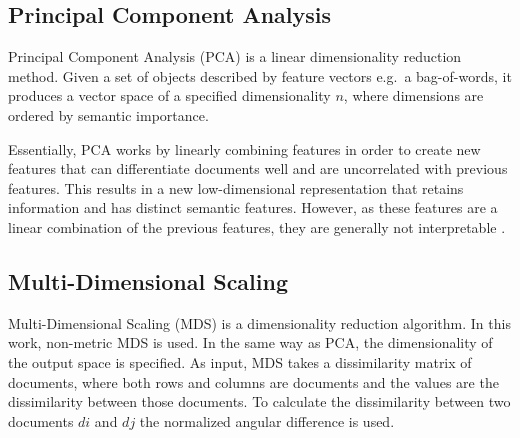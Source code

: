 \subsection{Principal Component Analysis}\label{ch2:PCA}









Principal Component Analysis (PCA) is a linear dimensionality reduction method. Given a set of objects described by feature vectors e.g.\  a bag-of-words, it produces a vector space of a specified dimensionality $n$, where dimensions are  ordered by semantic importance. 

Essentially, PCA works by linearly combining features in order to create new features that can differentiate documents well and are uncorrelated with previous features. This results in a new low-dimensional representation that retains information and has distinct semantic features. However, as these features are a linear combination of the previous features, they are generally not interpretable \cite{Gimenez}. 


\subsection{Multi-Dimensional Scaling}\label{ch2:MDS}


Multi-Dimensional Scaling  (MDS) is a dimensionality reduction algorithm. In this work, non-metric MDS is used. In the same way as PCA, the dimensionality of the output space is specified. As input, MDS takes a dissimilarity matrix of documents, where both rows and columns are documents and the values are the dissimilarity between those documents. To calculate the dissimilarity between two documents $di$ and $dj$ the normalized angular difference is used.

